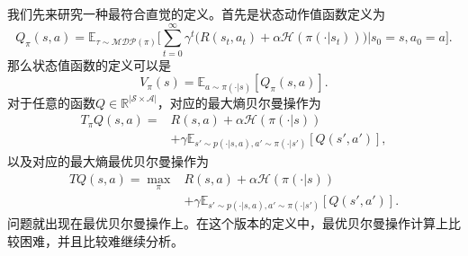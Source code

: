 我们先来研究一种最符合直觉的定义。首先是状态动作值函数定义为
\begin{equation}
    Q_{\pi}(s, a) = \mathbb{E}_{\tau \sim \mathcal{MDP}(\pi)} \bigg[\sum^{\infty}_{t=0} \gamma^t \bigg(R(s_t, a_t) + \alpha \mathcal{H}(\pi(\cdot \vert s_t))\bigg) \bigg\vert s_0 = s, a_0 = a\bigg].
\end{equation}
那么状态值函数的定义可以是
\begin{equation}
    V_{\pi}(s) = \mathbb{E}_{a \sim \pi(\cdot \vert s)}[Q_{\pi}(s, a)].
\end{equation}
对于任意的函数$Q \in \mathbb{R}^{\vert \mathcal{S} \times \mathcal{A} \vert }$，对应的最大熵贝尔曼操作为
\begin{equation}
    \begin{aligned}
    T_{\pi}Q (s, a) =& R(s, a) + \alpha \mathcal{H}(\pi(\cdot \vert s)) \\
    & + \gamma \mathbb{E}_{s' \sim p(\cdot \vert s, a), a' \sim \pi(\cdot \vert s')}[Q(s', a')],
    \end{aligned}
\end{equation}
以及对应的最大熵最优贝尔曼操作为
\begin{equation}
    \begin{aligned}
    TQ (s, a) = \max_{\pi} & R(s, a) + \alpha \mathcal{H}(\pi(\cdot \vert s)) \\
    & + \gamma \mathbb{E}_{s' \sim p(\cdot \vert s, a), a' \sim \pi(\cdot \vert s')}[Q(s', a')].
    \end{aligned}
\end{equation}
问题就出现在最优贝尔曼操作上。在这个版本的定义中，最优贝尔曼操作计算上比较困难，并且比较难继续分析。

